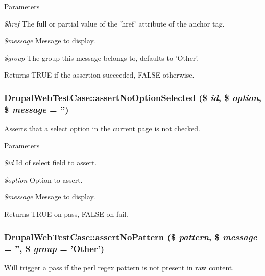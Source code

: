\begin{DoxyParams}{Parameters}
\item[{\em \$href}]The full or partial value of the 'href' attribute of the anchor tag. \item[{\em \$message}]Message to display. \item[{\em \$group}]The group this message belongs to, defaults to 'Other'.\end{DoxyParams}
\begin{DoxyReturn}{Returns}
TRUE if the assertion succeeded, FALSE otherwise. 
\end{DoxyReturn}
\hypertarget{classDrupalWebTestCase_acb8121ae5a53f0aee3228f5cc48e8265}{
\subsubsection[{assertNoOptionSelected}]{\setlength{\rightskip}{0pt plus 5cm}DrupalWebTestCase::assertNoOptionSelected (\$ {\em id}, \/  \$ {\em option}, \/  \$ {\em message} = {\ttfamily ''})}}
\label{classDrupalWebTestCase_acb8121ae5a53f0aee3228f5cc48e8265}
Asserts that a select option in the current page is not checked.


\begin{DoxyParams}{Parameters}
\item[{\em \$id}]Id of select field to assert. \item[{\em \$option}]Option to assert. \item[{\em \$message}]Message to display. \end{DoxyParams}
\begin{DoxyReturn}{Returns}
TRUE on pass, FALSE on fail. 
\end{DoxyReturn}
\hypertarget{classDrupalWebTestCase_a03d422398b9fc1f8844b7ff7fe468ed5}{
\subsubsection[{assertNoPattern}]{\setlength{\rightskip}{0pt plus 5cm}DrupalWebTestCase::assertNoPattern (\$ {\em pattern}, \/  \$ {\em message} = {\ttfamily ''}, \/  \$ {\em group} = {\ttfamily 'Other'})}}
\label{classDrupalWebTestCase_a03d422398b9fc1f8844b7ff7fe468ed5}
Will trigger a pass if the perl regex pattern is not present in raw content.


